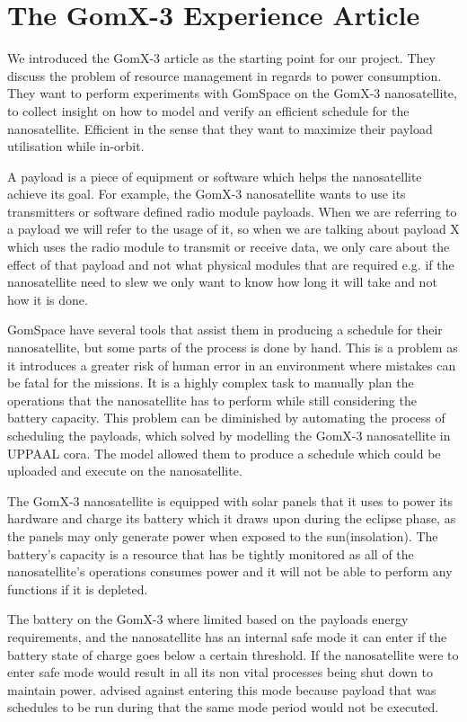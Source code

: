 \section{The GomX-3 Experience Article}
We introduced the GomX-3 article as the starting point for our project. They discuss the problem of resource management in regards to power consumption. They want to perform experiments with GomSpace on the GomX-3 nanosatellite, to collect insight on how to model and verify an efficient schedule for the nanosatellite. Efficient in the sense that they want to maximize their payload utilisation while in-orbit. 

A payload is a piece of equipment or software which helps the nanosatellite achieve its goal. For example, the GomX-3 nanosatellite wants to use its transmitters or software defined radio module payloads. When we are referring to a payload we will refer to the usage of it, so when we are talking about payload X which uses the radio module to transmit or receive data, we only care about the effect of that payload and not what physical modules that are required e.g. if the nanosatellite need to slew we only want to know how long it will take and not how it is done.

GomSpace have several tools that assist them in producing a schedule for their nanosatellite, but some parts of the process is done by hand. This is a problem as it introduces a greater risk of human error in an environment where mistakes can be fatal for the missions. It is a highly complex task to manually plan the operations that the nanosatellite has to perform while still considering the battery capacity. This problem can be diminished by automating the process of scheduling the payloads, which \cite{gomx3} solved by modelling the GomX-3 nanosatellite in UPPAAL \gls{cora}. The model allowed them to produce a schedule which could be uploaded and execute on the nanosatellite.

The GomX-3 nanosatellite is equipped with solar panels that it uses to power its hardware and charge its battery which it draws upon during the eclipse phase, as the panels may only generate power when exposed to the sun(insolation). The battery's capacity is a resource that has be tightly monitored as all of the nanosatellite's operations consumes power and it will not be able to perform any functions if it is depleted.\cite{gomx3}

The battery on the GomX-3 where limited based on the payloads energy requirements, and the nanosatellite has an internal safe mode it can enter if the battery state of charge goes below a certain threshold. If the nanosatellite were to enter safe mode would result in all its non vital processes being shut down to maintain power. \cite{gomx3} advised against entering this mode because payload that was schedules to be run during that the same mode period would not be executed.

